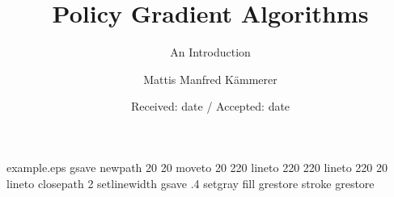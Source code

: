 \begin{filecontents*}{example.eps}
gsave
newpath
  20 20 moveto
  20 220 lineto
  220 220 lineto
  220 20 lineto
closepath
2 setlinewidth
gsave
  .4 setgray fill
grestore
stroke
grestore
\end{filecontents*}
\RequirePackage{fix-cm}
\documentclass[final]{svjour3}
\smartqed
\usepackage[T1]{fontenc}
\usepackage[utf8]{inputenc}
\usepackage{graphicx}
\graphicspath{ {./images/} }
\usepackage{amsmath,amssymb}
\usepackage{hyperref}
\usepackage{tikz}
\usepackage{environ}
\usetikzlibrary{shapes,arrows,positioning,calc}


\title{Policy Gradient Algorithms}
\subtitle{An Introduction}

\author {Mattis Manfred K{\"a}mmerer}


\date{Received: date / Accepted: date}

\maketitle

\begin{abstract}

The goal of policy gradient approaches is to find a policy in a given class of policies which maximizes the expected return.
Given a differentiable model of the policy, we want to apply a gradient-ascent technique to reach the local optimum. 
Gradient ascent is theoretically well researched.
The main issue is that the policy gradient with respect to the expected return is not available, thus we need to estimate it.
For this reason, the biggest weakness of policy gradient algorithms is sample efficiency, as they tend to require on-policy data for the gradient estimate.
Thus, most research is focused on finding algorithms with improved sample efficiency.
This paper provides a deep introduction to policy gradient that shows the development of policy gradient approaches, and should enable the reader to follow current research in the area. 

\end{abstract}

\section{Introduction}
\label{intro}

